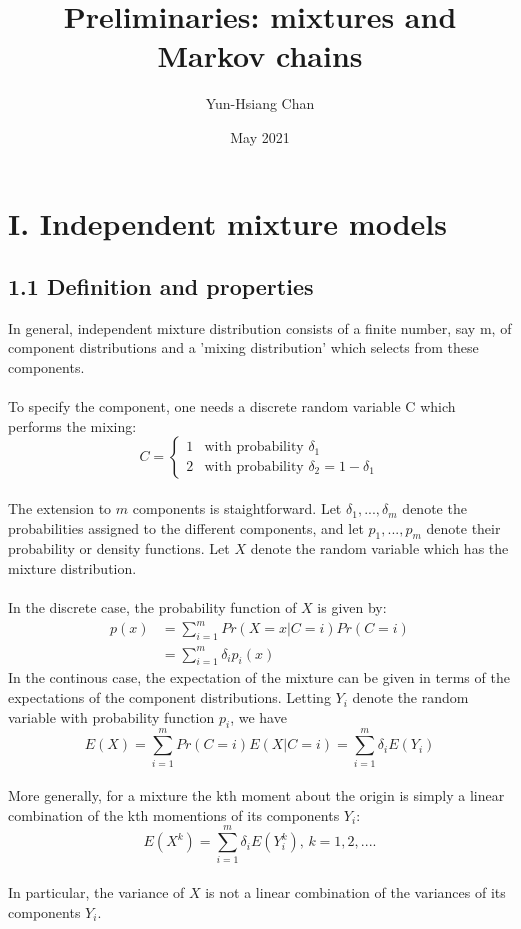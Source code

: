 \documentclass{article}
\title{Preliminaries: mixtures and Markov chains}
\author{Yun-Hsiang Chan}
\date{May 2021}
\begin{document}
\maketitle

\section*{I. Independent mixture models}
\subsection*{1.1 Definition and properties}

In general, independent mixture distribution consists of a finite number, say m, of component distributions and a 'mixing distribution' which selects from these components. \\
\\
To specify the component, one needs a discrete random variable C which performs the mixing:
\[ C = \begin{cases} 1 & \mbox{with probability $\delta_1$} \\ 2 & \mbox{with probability $\delta_2 = 1 - \delta_1$} \end{cases} \]
\\
The extension to $m$ components is staightforward. Let $\delta_1, ..., \delta_m$ denote the probabilities assigned to the different components, and let $p_1, ..., p_m$ denote their probability or density functions. Let $X$ denote the random variable which has the mixture distribution. \\
\\
In the discrete case, the probability function of $X$ is given by:
\begin{align}
    p(x) & = \sum_{i=1}^m Pr(X = x | C = i) Pr(C = i) \\
    & = \sum_{i=1}^m \delta_i p_i(x)
\end{align}
In the continous case, the expectation of the mixture can be given in terms of the expectations of the component distributions. Letting $Y_i$ denote the random variable with probability function $p_i$, we have \\
$$E(X) = \sum_{i=1}^m Pr(C = i) E(X | C = i) = \sum_{i=1}^m \delta_i E(Y_i)$$
\\
More generally, for a mixture the kth moment about the origin is simply a linear combination of the kth momentions of its components $Y_i$:
$$E(X^k) = \sum_{i=1}^m \delta_i E(Y_i^k) \text{, $k = 1, 2, ....$}$$
\\
In particular, the variance of $X$ is not a linear combination of the variances of its components $Y_i$. 
\end{document}
